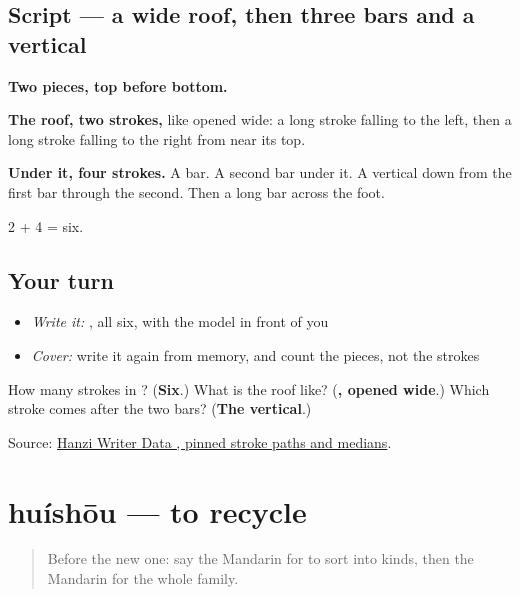 \subsection*{Script — a wide roof, then three bars and a vertical}

\begin{quote}
\end{quote}

\textbf{Two pieces, top before bottom.}

\textbf{The roof, two strokes,} like  opened wide: a long stroke falling to the left, then a long stroke falling to the right from near its top.

\textbf{Under it, four strokes.} A bar. A second bar under it. A vertical down from the first bar through the second. Then a long bar across the foot.

2 + 4 = six.

\subsection*{Your turn}
\begin{itemize}
\raggedright
  \item \emph{Write it:} , all six, with the model in front of you
  \item \emph{Cover:} write it again from memory, and count the pieces, not the strokes
\end{itemize}

\begin{tcolorbox}[breakable,colback=teal!4,colframe=teal!35!black,title={Before you move on}]
How many strokes in ? (\textbf{Six}.) What is the roof like? (\textbf{, opened wide}.) Which stroke comes after the two bars? (\textbf{The vertical}.)

Source: \href{https://raw.githubusercontent.com/chanind/hanzi-writer-data/68d10a4b21150cae5e1ebbd223eed289cf32d90c/data/\%E5\%85\%A8.json}{Hanzi Writer Data , pinned stroke paths and medians}.
\end{tcolorbox}
\section[huíshōu]{huíshōu — to recycle}

\label{lesson:ZH-C381-huishou}



\begin{quote}
Before the new one: say the Mandarin for to sort into kinds, then the Mandarin for the whole family.
\end{quote}

